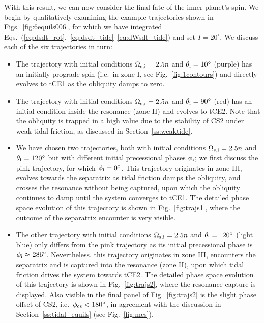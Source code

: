 \documentclass[
        fleqn,
        usenatbib,
        referee,
    ]{mnras}
\begin{document}
With this result, we can now consider the final fate of the inner planet's spin.
We begin by qualitatively examining the example trajectories shown in
Figs.~\ref{fig:6equils006}, for which we have integrated
Eqs.~(\ref{eq:dsdt_rot},~\ref{eq:dsdt_tide}--\ref{eq:dWsdt_tide}) and set $I =
20^\circ$. We discuss each of the six trajectories in turn:
\begin{itemize}
    \item The trajectory with initial conditions $\Omega_{\rm s, i} = 2.5n$ and
        $\theta_{\rm i} = 10^\circ$ (purple) has an initially prograde spin
        (i.e.\ in zone I, see Fig.~\ref{fig:1contours}) and directly evolves to
        tCE1 as the obliquity damps to zero.

    \item The trajectory with initial conditions $\Omega_{\rm s, i} = 2.5n$ and
        $\theta_{\rm i} = 90^\circ$ (red) has an initial condition inside the
        resonance (zone II) and evolves to tCE2. Note that the obliquity is
        trapped in a high value due to the stability of CS2 under weak tidal
        friction, as discussed in Section~\ref{ss:weaktide}.

    \item We have chosen two trajectories, both with initial conditions
        $\Omega_{\rm s, i} = 2.5n$ and $\theta_{\rm i} = 120^\circ$ but with
        different initial precessional phases $\phi_{\rm i}$; we first discuss
        the pink trajectory, for which $\phi_{\rm i} = 0^\circ$. This trajectory
        originates in zone III, evolves towards the separatrix as tidal friction
        damps the obliquity, and crosses the resonance without being captured,
        upon which the obliquity continues to damp until the system converges to
        tCE1. The detailed phase space evolution of this trajectory is shown in
        Fig.~\ref{fig:trajs1}, where the outcome of the separatrix encounter is
        very visible.

    \item The other trajectory with initial conditions $\Omega_{\rm s, i} = 2.5n$
        and $\theta_{\rm i} = 120^\circ$ (light blue) only differs from the pink
        trajectory as its initial precessional phase is $\phi_{\rm i} \approx
        286^\circ$. Nevertheless, this trajectory originates in zone III,
        encounters the separatrix and is captured into the resonance (zone II),
        upon which tidal friction drives the system towards tCE2. The detailed
        phase space evolution of this trajectory is shown in
        Fig.~\ref{fig:trajs2}, where the resonance capture is displayed. Also
        visible in the final panel of Fig.~\ref{fig:trajs2} is the slight phase
        offset of CS2, i.e.\ $\phi_{\rm cs} < 180^\circ$, in agreement with the
        discussion in Section~\ref{ss:tidal_equils} (see Fig.~\ref{fig:mcs}).


\end{itemize}
\end{document}
